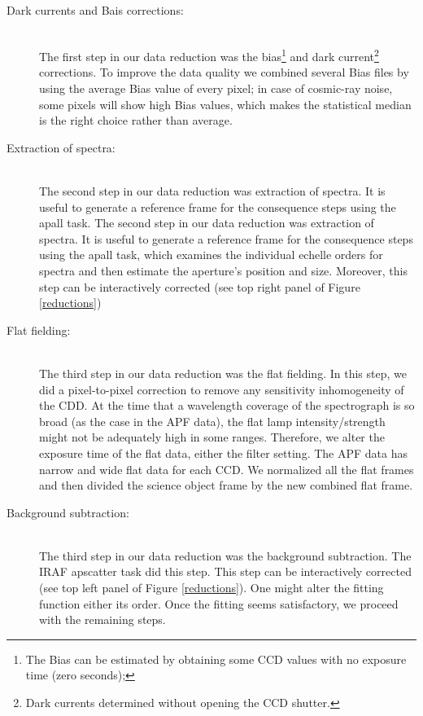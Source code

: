 \begin{description}
\item[Dark currents and Bais corrections:] \hfill \\ The first step in our data reduction was the bias\footnote{The Bias can be estimated by obtaining some CCD values with no exposure time (zero seconds); } and dark current\footnote{Dark currents determined without opening the CCD shutter.} corrections. To improve the data quality we combined several Bias files by using the average Bias value of every pixel; in case of cosmic-ray noise, some pixels will show high Bias values, which makes the statistical median is the right choice rather than average.
  
\item[Extraction of spectra:] \hfill \\ The second step in our data reduction was extraction of spectra. It is useful to generate a reference frame for the consequence steps using the apall task. The second step in our data reduction was extraction of spectra. It is useful to generate a reference frame for the consequence steps using the apall task, which examines the individual echelle orders for spectra and then estimate the aperture's position and size. Moreover, this step can be interactively corrected (see top right panel of Figure \ref{reductions})

\item[Flat fielding:] \hfill \\ The third step in our data reduction was the flat fielding. In this step, we did a pixel-to-pixel correction to remove any sensitivity inhomogeneity of the CDD. At the time that a wavelength coverage of the spectrograph is so broad (as the case in the APF data), the flat lamp intensity/strength might not be adequately high in some ranges. Therefore, we alter the exposure time of the flat data, either the filter setting. The APF data has narrow and wide flat data for each CCD. We normalized all the flat frames and then divided the science object frame by the new combined flat frame.

\item[Background subtraction:] \hfill \\ The third step in our data reduction was the background subtraction. The IRAF apscatter task did this step. This step can be interactively corrected (see top left panel of Figure \ref{reductions}). One might alter the fitting function either its order. Once the fitting seems satisfactory, we proceed with the remaining steps.


\end{description}
